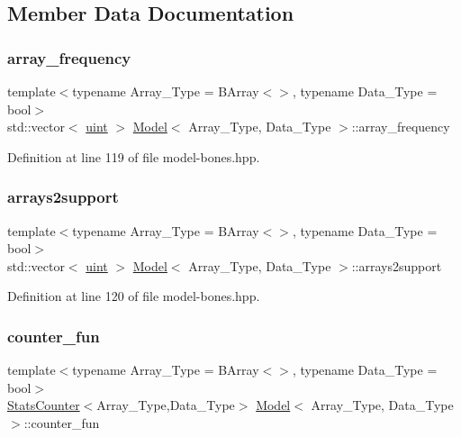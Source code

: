\subsection{Member Data Documentation}
\mbox{\label{class_model_a55b4255d2514b1b22a0fb7361187fead}} 
\subsubsection{\texorpdfstring{array\+\_\+frequency}{array\_frequency}}
{\footnotesize\ttfamily template$<$typename Array\+\_\+\+Type  = B\+Array$<$$>$, typename Data\+\_\+\+Type  = bool$>$ \\
std\+::vector$<$ \hyperlink{typedefs_8hpp_a91ad9478d81a7aaf2593e8d9c3d06a14}{uint} $>$ \hyperlink{class_model}{Model}$<$ Array\+\_\+\+Type, Data\+\_\+\+Type $>$\+::array\+\_\+frequency}



Definition at line 119 of file model-\/bones.\+hpp.

\mbox{\label{class_model_a880b9e2535fcdaea9cc60d4dbdc7bcbc}} 
\subsubsection{\texorpdfstring{arrays2support}{arrays2support}}
{\footnotesize\ttfamily template$<$typename Array\+\_\+\+Type  = B\+Array$<$$>$, typename Data\+\_\+\+Type  = bool$>$ \\
std\+::vector$<$ \hyperlink{typedefs_8hpp_a91ad9478d81a7aaf2593e8d9c3d06a14}{uint} $>$ \hyperlink{class_model}{Model}$<$ Array\+\_\+\+Type, Data\+\_\+\+Type $>$\+::arrays2support}



Definition at line 120 of file model-\/bones.\+hpp.

\mbox{\label{class_model_a126cffe699d64e664ba6aa0b1796c780}} 
\subsubsection{\texorpdfstring{counter\+\_\+fun}{counter\_fun}}
{\footnotesize\ttfamily template$<$typename Array\+\_\+\+Type  = B\+Array$<$$>$, typename Data\+\_\+\+Type  = bool$>$ \\
\hyperlink{class_stats_counter}{Stats\+Counter}$<$Array\+\_\+\+Type,Data\+\_\+\+Type$>$ \hyperlink{class_model}{Model}$<$ Array\+\_\+\+Type, Data\+\_\+\+Type $>$\+::counter\+\_\+fun}



